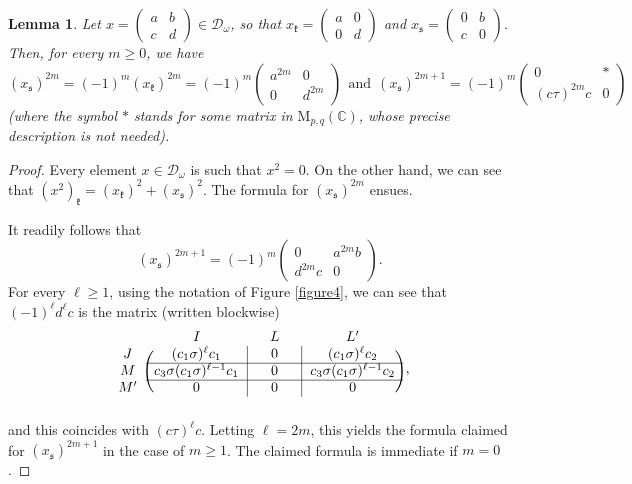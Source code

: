 \documentclass[11pt]{article}
\newtheorem{lemma}[theo]{Lemma}
\theoremstyle{definition}
\numberwithin{equation}{section}
\newcommand{\fk}{\mathfrak{k}}
\newcommand{\fs}{\mathfrak{s}}
\newcommand{\Mat}{\mathrm{M}}
\newcommand{\condir}{\mathcal{D}}
\newcommand{\mC}{\mathbb{C}}
\begin{document}
\begin{lemma}
\label{L4.8}
Let $x=\begin{pmatrix} a & b\\ c & d \end{pmatrix}\in\condir_\omega$, so that $x_\fk=\begin{pmatrix} a & 0\\ 0 & d\end{pmatrix}$ and $x_\fs=\begin{pmatrix} 0 & b\\ c & 0\end{pmatrix}$. Then, for every $m\geq 0$, we have
\[
(x_\fs)^{2m}=(-1)^m(x_\fk)^{2m}=(-1)^m\begin{pmatrix} a^{2m} & 0\\ 0 & d^{2m} \end{pmatrix}
\ \ \mbox{and}\ \
(x_\fs)^{2m+1}=(-1)^m\begin{pmatrix} 0 & *\\ (c\tau)^{2m}c & 0 \end{pmatrix}
\]
\textup{(}where the symbol $*$ stands for some matrix in $\Mat_{p,q}(\mC)$, whose precise description is not needed\textup{)}.
\end{lemma}

\begin{proof}
Every element $x\in\condir_\omega$ is such that $x^2=0$. On the other hand, we can see that $(x^2)_\fk=(x_\fk)^2+(x_\fs)^2$. The formula for $(x_\fs)^{2m}$ ensues.

It readily follows that
\[(x_\fs)^{2m+1}=(-1)^m\begin{pmatrix} 0 & a^{2m}b\\ d^{2m}c & 0 \end{pmatrix}.\]
For every $\ell\geq 1$, using the notation of Figure \ref{figure4},
we can see that $(-1)^\ell d^\ell c$ is the matrix (written
blockwise)
\begin{equation}
\label{powers1}
\begin{blockarray}{cccc}
{} & {\quad I\quad} & {\quad L\quad} & {\quad L'\quad}\\
\begin{block}{c(c|c|c)}
J & (c_1\sigma)^\ell c_1 & 0 & (c_1\sigma)^\ell c_2\\
\cline{2-4}
M & c_3\sigma(c_1\sigma)^{\ell-1}c_1 & 0 & c_3\sigma(c_1\sigma)^{\ell-1}c_2\\
\cline{2-4}
M' & 0 & 0 & 0\\
\end{block}
\end{blockarray}
\,,
\end{equation}
and this coincides with $(c\tau)^\ell c$.
Letting $\ell=2m$, this yields the formula claimed for $(x_\fs)^{2m+1}$ in the case of $m\geq 1$. The claimed formula is immediate if $m=0$.
\end{proof}
\end{document}
